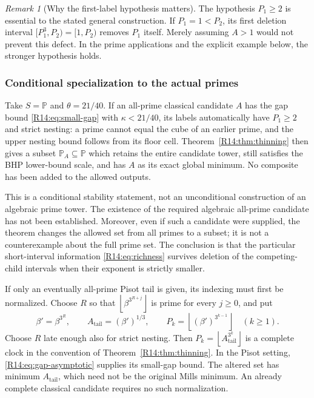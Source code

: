 \documentclass[11pt,a4paper]{article}
\theoremstyle{definition}\newtheorem{definition}[theorem]{Definition}
\theoremstyle{remark}\newtheorem{remark}[theorem]{Remark}
\newcommand{\PP}{\mathbb P}\newcommand{\W}{\mathcal W}\newcommand{\SaitoL}{\mathcal S}
\newcommand{\floor}[1]{\left\lfloor#1\right\rfloor}
\begin{document}
\begin{remark}[Why the first-label hypothesis matters]
The hypothesis $P_1\ge2$ is essential to the stated general
construction. If $P_1=1<P_2$, its first deletion interval
$[P_1^3,P_2)=[1,P_2)$ removes $P_1$ itself. Merely assuming
$A>1$ would not prevent this defect. In the prime applications and
the explicit example below, the stronger hypothesis holds.
\end{remark}

\subsubsection{Conditional specialization to the actual primes}

Take $S=\PP$ and $\theta=21/40$. If an all-prime classical
candidate $A$ has the gap bound \eqref{R14:eq:small-gap} with
$\kappa<21/40$, its labels automatically have $P_1\ge2$ and
strict nesting: a prime cannot equal the cube of an earlier prime,
and the upper nesting bound follows from its floor cell.
Theorem~\ref{R14:thm:thinning} then gives a subset $\PP_A\subseteq\PP$
which retains the entire candidate tower, still satisfies the BHP
lower-bound scale, and has $A$ as its exact global minimum.
No composite has been added to the allowed outputs.

This is a conditional stability statement, not an unconditional
construction of an algebraic prime tower. The existence of the
required algebraic all-prime candidate has not been established.
Moreover, even if such a candidate were supplied, the theorem
changes the allowed set from all primes to a subset; it is not a
counterexample about the full prime set. The conclusion is that
the particular short-interval information
\eqref{R14:eq:richness} survives deletion of the competing-child
intervals when their exponent is strictly smaller.

If only an eventually all-prime Pisot tail is given, its indexing
must first be normalized. Choose $R$ so that
$\floor{\beta^{3^{R+j}}}$ is prime for every $j\ge0$, and put
\begin{equation}\label{R14:eq:tail-normalization}
 \beta'=\beta^{3^R},\qquad A_{\mathrm{tail}}=(\beta')^{1/3},
 \qquad
 P_k=\floor{(\beta')^{3^{k-1}}}\quad(k\ge1).
\end{equation}
Choose $R$ late enough also for strict nesting. Then
$P_k=\floor{A_{\mathrm{tail}}^{3^k}}$ is a complete clock in the
convention of Theorem~\ref{R14:thm:thinning}. In the Pisot setting,
\eqref{R14:eq:gap-asymptotic} supplies its small-gap bound. The altered
set has minimum $A_{\mathrm{tail}}$, which need not be the original
Mills minimum. An already complete classical candidate requires no
such normalization.
\end{document}
